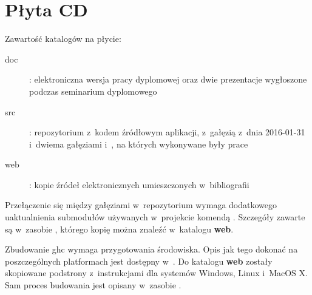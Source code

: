 \chapter{Płyta CD}\label{app:plyta}

\begin{figure}[htb]
\makebox[\textwidth]{\framebox[12.8cm]{\rule{0pt}{12.8cm}}}
\end{figure}
\pagebreak

Zawartość katalogów na płycie:
\begin{description}
    \item[doc] : elektroniczna wersja pracy dyplomowej oraz dwie prezentacje wygłoszone podczas seminarium dyplomowego
    \item[src] : repozytorium z~kodem źródłowym aplikacji, z~gałęzią  z~dnia 2016-01-31 i~dwiema gałęziami  i~, na których wykonywane były prace
    \item[web] : kopie źródeł elektronicznych umieszczonych w~bibliografii
\end{description}

Przełączenie się między gałęziami w~repozytorium wymaga dodatkowego uaktualnienia submodułów używanych w~projekcie komendą . Szczegóły zawarte są w~zasobie \cite{WikiGettingTheSources}, którego kopię można znaleźć w~katalogu \textbf{web}.

Zbudowanie ghc wymaga przygotowania środowiska. Opis jak tego dokonać na poszczególnych platformach jest dostępny w~\cite{WikiPreparation}. Do katalogu \textbf{web} zostały skopiowane podstrony z~instrukcjami dla systemów Windows, Linux i~MacOS X. Sam proces budowania jest opisany w~zasobie \cite{WikiNewcomers}.
